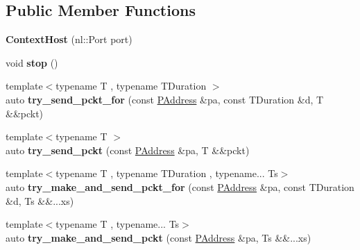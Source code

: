 \subsection*{Public Member Functions}
\begin{DoxyCompactItemize}
\item 
\hypertarget{classexperiment_1_1ContextHost_adb4f5d162ffadfc8a01e92a7679921c4}{}{\bfseries Context\+Host} (nl\+::\+Port port)\label{classexperiment_1_1ContextHost_adb4f5d162ffadfc8a01e92a7679921c4}

\item 
\hypertarget{classexperiment_1_1ContextHost_a7b81799a5f49ec088426ea6828b13cb5}{}void {\bfseries stop} ()\label{classexperiment_1_1ContextHost_a7b81799a5f49ec088426ea6828b13cb5}

\item 
\hypertarget{classexperiment_1_1ContextHost_a81478849fd6be0e3a9e477315640612a}{}{\footnotesize template$<$typename T , typename T\+Duration $>$ }\\auto {\bfseries try\+\_\+send\+\_\+pckt\+\_\+for} (const \hyperlink{structnl_1_1PAddress}{P\+Address} \&pa, const T\+Duration \&d, T \&\&pckt)\label{classexperiment_1_1ContextHost_a81478849fd6be0e3a9e477315640612a}

\item 
\hypertarget{classexperiment_1_1ContextHost_a104dd3085b47ee168da8448e6b0a2c16}{}{\footnotesize template$<$typename T $>$ }\\auto {\bfseries try\+\_\+send\+\_\+pckt} (const \hyperlink{structnl_1_1PAddress}{P\+Address} \&pa, T \&\&pckt)\label{classexperiment_1_1ContextHost_a104dd3085b47ee168da8448e6b0a2c16}

\item 
\hypertarget{classexperiment_1_1ContextHost_ac0e1482bcd559dd01965f2d0b08565a6}{}{\footnotesize template$<$typename T , typename T\+Duration , typename... Ts$>$ }\\auto {\bfseries try\+\_\+make\+\_\+and\+\_\+send\+\_\+pckt\+\_\+for} (const \hyperlink{structnl_1_1PAddress}{P\+Address} \&pa, const T\+Duration \&d, Ts \&\&...xs)\label{classexperiment_1_1ContextHost_ac0e1482bcd559dd01965f2d0b08565a6}

\item 
\hypertarget{classexperiment_1_1ContextHost_ad65ee5e4fe93f7110070ec7a0ce6f8fb}{}{\footnotesize template$<$typename T , typename... Ts$>$ }\\auto {\bfseries try\+\_\+make\+\_\+and\+\_\+send\+\_\+pckt} (const \hyperlink{structnl_1_1PAddress}{P\+Address} \&pa, Ts \&\&...xs)\label{classexperiment_1_1ContextHost_ad65ee5e4fe93f7110070ec7a0ce6f8fb}


\end{DoxyCompactItemize}
